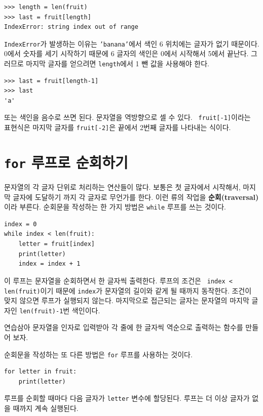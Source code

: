 \documentclass[10pt]{book}
\begin{document}
\begin{verbatim}
>>> length = len(fruit)
>>> last = fruit[length]
IndexError: string index out of range
\end{verbatim}
%
{\tt IndexError}가 발생하는 이유는 {\tt 'banana'}에서 색인 6 위치에는
글자가 없기 때문이다.  0에서 숫자를 세기 시작하기 때문에 6 글자의
색인은 0에서 시작해서 5에서 끝난다.  그러므로 마지막 글자를 얻으려면
{\tt length}에서 1 뺀 값을 사용해야 한다.

\begin{verbatim}
>>> last = fruit[length-1]
>>> last
'a'
\end{verbatim}
%
또는 색인을 음수로 쓰면 된다.  문자열을 역방향으로 셀 수 있다.  {\tt
  fruit[-1]}이라는 표현식은 마지막 글자를 {\tt fruit[-2]}은 끝에서
2번째 글자를 나타내는 식이다.


\section{{\tt for} 루프로 순회하기}
\label{for}

문자열의 각 글자 단위로 처리하는 연산들이 많다.  보통은 첫 글자에서
시작해서, 마지막 글자에 도달하기 까지 각 글자로 무언가를 한다.  이런
류의 작업을 {\bf 순회(traversal)}이라 부른다.  순회문을 작성하는 한
가지 방법은 {\tt while} 루프를 쓰는 것이다.

\begin{verbatim}
index = 0
while index < len(fruit):
    letter = fruit[index]
    print(letter)
    index = index + 1
\end{verbatim}
%

이 루프는 문자열을 순회하면서 한 글자씩 출력한다.  루프의 조건은 {\tt
  index < len(fruit)}이기 때문에 {\tt index}가 문자열의 길이와 같게 될
때까지 동작한다.  조건이 맞지 않으면 루프가 실행되지 않는다.
마지막으로 접근되는 글자는 문자열의 마지막 글자인 {\tt len(fruit)-1}번
색인이다.

연습삼아 문자열을 인자로 입력받아 각 줄에 한 글자씩 역순으로 출력하는
함수를 만들어 보자.

순회문을 작성하는 또 다른 방법은 {\tt for} 루프를 사용하는 것이다. 

\begin{verbatim}
for letter in fruit:
    print(letter)
\end{verbatim}
%
루프를 순회할 때마다 다음 글자가 {\tt letter} 변수에 할당된다.  루프는
더 이상 글자가 없을 때까지 계속 실행된다.
\end{document}
